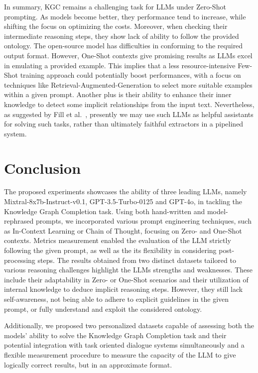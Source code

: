 \documentclass[runningheads]{llncs}
\begin{document}
In summary, KGC remains a challenging task for LLMs under Zero-Shot prompting. As models become better, they performance tend to increase, while shifting the focus on optimizing the costs.
Moreover, when checking their intermediate reasoning steps, they show lack of ability to follow the provided ontology. The open-source model has difficulties in conforming to the required output format. However, One-Shot contexts give promising results as LLMs excel in emulating a provided example. This implies that a less resource-intensive Few-Shot training approach could potentially boost performances, with a focus on techniques like Retrieval-Augmented-Generation to select more suitable examples within a given prompt. Another plus is their ability to enhance their inner knowledge to detect some implicit relationships from the input text. Nevertheless, as suggested by Fill et al.~\cite{fill2023}, presently we may use such LLMs as helpful assistants for solving such tasks, rather than ultimately faithful extractors in a pipelined system.

\section{Conclusion}
\label{seq:conclusion}

The proposed experiments showcases the ability of three leading LLMs, namely Mixtral-8x7b-Instruct-v0.1, GPT-3.5-Turbo-0125 and GPT-4o, in tackling the Knowledge Graph Completion task. 
Using both hand-written and model-rephrased prompts, we incorporated various prompt engineering techniques, such as In-Context Learning or Chain of Thought, focusing on Zero- and One-Shot contexts. Metrics measurement enabled the evaluation of the LLM strictly following the given prompt, as well as the its flexibility in considering post-processing steps. 
The results obtained from two distinct datasets tailored to various reasoning challenges highlight the LLMs strengths and weaknesses. These include their adaptability in Zero- or One-Shot scenarios and their utilization of internal knowledge to deduce implicit reasoning steps. However, they still lack self-awareness, not being able to adhere to explicit guidelines in the given prompt, or fully understand and exploit the considered ontology.

Additionally, we proposed two personalized datasets capable of assessing both the models' ability to solve the Knowledge Graph Completion task and their potential integration with task oriented dialogue systems simultaneously and a flexible measurement procedure to measure the capacity of the LLM to give logically correct results, but in an approximate format. 
\end{document}
